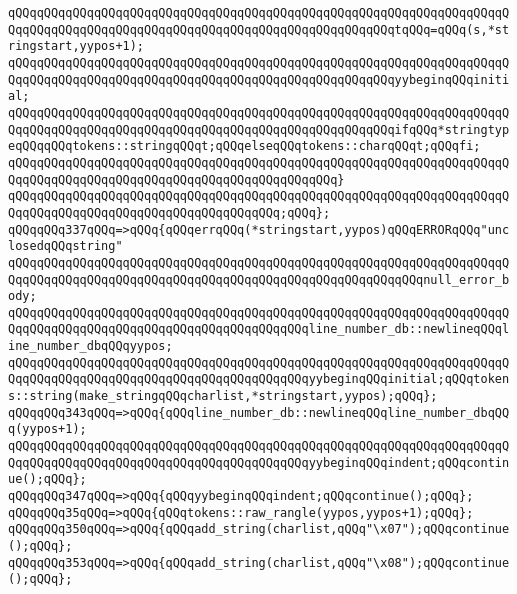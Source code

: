 \verb|qQQqqQQqqQQqqQQqqQQqqQQqqQQqqQQqqQQqqQQqqQQqqQQqqQQqqQQqqQQqqQQqqQQqqQQqqQQqqQQqqQQqqQQqqQQqqQQqqQQqqQQqqQQqqQQqqQQqqQQqqQQqtqQQq=qQQq(s,*stringstart,yypos+1);|\newline
\verb|qQQqqQQqqQQqqQQqqQQqqQQqqQQqqQQqqQQqqQQqqQQqqQQqqQQqqQQqqQQqqQQqqQQqqQQqqQQqqQQqqQQqqQQqqQQqqQQqqQQqqQQqqQQqqQQqqQQqqQQqqQQqyybeginqQQqinitial;|\newline
\verb|qQQqqQQqqQQqqQQqqQQqqQQqqQQqqQQqqQQqqQQqqQQqqQQqqQQqqQQqqQQqqQQqqQQqqQQqqQQqqQQqqQQqqQQqqQQqqQQqqQQqqQQqqQQqqQQqqQQqqQQqqQQqifqQQq*stringtypeqQQqqQQqtokens::stringqQQqt;qQQqelseqQQqtokens::charqQQqt;qQQqfi;|\newline
\verb|qQQqqQQqqQQqqQQqqQQqqQQqqQQqqQQqqQQqqQQqqQQqqQQqqQQqqQQqqQQqqQQqqQQqqQQqqQQqqQQqqQQqqQQqqQQqqQQqqQQqqQQqqQQqqQQqqQQq}|\newline
\verb|qQQqqQQqqQQqqQQqqQQqqQQqqQQqqQQqqQQqqQQqqQQqqQQqqQQqqQQqqQQqqQQqqQQqqQQqqQQqqQQqqQQqqQQqqQQqqQQqqQQqqQQqqQQq;qQQq};|\newline
\verb|qQQqqQQq337qQQq=>qQQq{qQQqerrqQQq(*stringstart,yypos)qQQqERRORqQQq"unclosedqQQqstring"|\newline
\verb|qQQqqQQqqQQqqQQqqQQqqQQqqQQqqQQqqQQqqQQqqQQqqQQqqQQqqQQqqQQqqQQqqQQqqQQqqQQqqQQqqQQqqQQqqQQqqQQqqQQqqQQqqQQqqQQqqQQqqQQqqQQqqQQqnull_error_body;|\newline
\verb|qQQqqQQqqQQqqQQqqQQqqQQqqQQqqQQqqQQqqQQqqQQqqQQqqQQqqQQqqQQqqQQqqQQqqQQqqQQqqQQqqQQqqQQqqQQqqQQqqQQqqQQqqQQqqQQqline_number_db::newlineqQQqline_number_dbqQQqyypos;|\newline
\verb|qQQqqQQqqQQqqQQqqQQqqQQqqQQqqQQqqQQqqQQqqQQqqQQqqQQqqQQqqQQqqQQqqQQqqQQqqQQqqQQqqQQqqQQqqQQqqQQqqQQqqQQqqQQqqQQqyybeginqQQqinitial;qQQqtokens::string(make_stringqQQqcharlist,*stringstart,yypos);qQQq};|\newline
\verb|qQQqqQQq343qQQq=>qQQq{qQQqline_number_db::newlineqQQqline_number_dbqQQq(yypos+1);|\newline
\verb|qQQqqQQqqQQqqQQqqQQqqQQqqQQqqQQqqQQqqQQqqQQqqQQqqQQqqQQqqQQqqQQqqQQqqQQqqQQqqQQqqQQqqQQqqQQqqQQqqQQqqQQqqQQqqQQqyybeginqQQqindent;qQQqcontinue();qQQq};|\newline
\verb|qQQqqQQq347qQQq=>qQQq{qQQqyybeginqQQqindent;qQQqcontinue();qQQq};|\newline
\verb|qQQqqQQq35qQQq=>qQQq{qQQqtokens::raw_rangle(yypos,yypos+1);qQQq};|\newline
\verb|qQQqqQQq350qQQq=>qQQq{qQQqadd_string(charlist,qQQq"\x07");qQQqcontinue();qQQq};|\newline
\verb|qQQqqQQq353qQQq=>qQQq{qQQqadd_string(charlist,qQQq"\x08");qQQqcontinue();qQQq};|\newline
